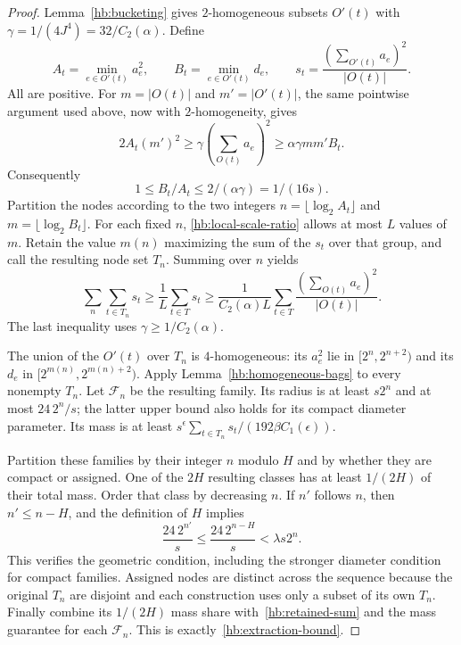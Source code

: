 \begin{proof}
Lemma~\ref{hb:bucketing} gives $2$-homogeneous subsets $O'(t)$ with
$\gamma=1/(4J^4)=32/C_2(\alpha)$.  Define
\[
 A_t=\min_{e\in O'(t)}a_e^2,
 \qquad B_t=\min_{e\in O'(t)}d_e,
 \qquad s_t=\frac{(\sum_{O'(t)}a_e)^2}{|O(t)|}.
\]
All are positive.  For $m=|O(t)|$ and $m'=|O'(t)|$, the same
pointwise argument used above, now with $2$-homogeneity, gives
\[
 2A_t(m')^2\ge\gamma\left(\sum_{O(t)}a_e\right)^2
 \ge\alpha\gamma mm'B_t.
\]
Consequently
\begin{equation}\label{hb:local-scale-ratio}
 1\le B_t/A_t\le2/(\alpha\gamma)=1/(16s).
\end{equation}
Partition the nodes according to the two integers
$n=\lfloor\log_2 A_t\rfloor$ and
$m=\lfloor\log_2 B_t\rfloor$.  For each fixed $n$,
\eqref{hb:local-scale-ratio} allows at most $L$ values of $m$.
Retain the value $m(n)$ maximizing the sum of the $s_t$ over that group,
and call the resulting node set $T_n$.  Summing over $n$ yields
\begin{equation}\label{hb:retained-sum}
 \sum_n\sum_{t\in T_n}s_t
 \ge\frac1L\sum_{t\in T}s_t
 \ge\frac1{C_2(\alpha)L}
       \sum_{t\in T}\frac{(\sum_{O(t)}a_e)^2}{|O(t)|}.
\end{equation}
The last inequality uses $\gamma\ge1/C_2(\alpha)$.

The union of the $O'(t)$ over $T_n$ is $4$-homogeneous: its $a_e^2$
lie in $[2^n,2^{n+2})$ and its $d_e$ in
$[2^{m(n)},2^{m(n)+2})$.  Apply
Lemma~\ref{hb:homogeneous-bags} to every nonempty $T_n$.
Let $\mathcal F_n$ be the resulting family.  Its radius is at least
$s2^n$ and at most $24\,2^n/s$; the latter upper bound also holds for
its compact diameter parameter.  Its mass is at least
$s^\epsilon\sum_{t\in T_n}s_t/(192\beta C_1(\epsilon))$.

Partition these families by their integer $n$ modulo $H$ and by whether
they are compact or assigned.  One of the $2H$ resulting classes has
at least $1/(2H)$ of their total mass.  Order that class by decreasing
$n$.  If $n'$ follows $n$, then $n'\le n-H$, and the definition of $H$
implies
\[
 \frac{24\,2^{n'}}s
 \le\frac{24\,2^{n-H}}s
 <\lambda s2^n.
\]
This verifies the geometric condition, including the stronger diameter
condition for compact families.  Assigned nodes are distinct across the
sequence because the original $T_n$ are disjoint and each construction
uses only a subset of its own $T_n$.  Finally combine its $1/(2H)$ mass
share with~\eqref{hb:retained-sum} and the mass guarantee for each
$\mathcal F_n$.  This is exactly~\eqref{hb:extraction-bound}.
\end{proof}
